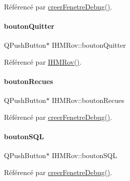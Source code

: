 Référencé par \hyperlink{class_i_h_m_rov_a30b49bada719a73e0899ad4bafb4de99}{creer\+Fenetre\+Debug()}.

\mbox{\label{class_i_h_m_rov_a75b93974e71e86a6a14ea1bc47fa7bd8}} 
\paragraph{\texorpdfstring{bouton\+Quitter}{boutonQuitter}}
{\footnotesize\ttfamily Q\+Push\+Button$\ast$ I\+H\+M\+Rov\+::bouton\+Quitter\hspace{0.3cm}{\ttfamily [private]}}



Référencé par \hyperlink{class_i_h_m_rov_a5dac1fb4612866cc61f699a415e0ef6b}{I\+H\+M\+Rov()}.

\mbox{\label{class_i_h_m_rov_ae56bf1c744f0fc393ef517e0e66b0d12}} 
\paragraph{\texorpdfstring{bouton\+Recues}{boutonRecues}}
{\footnotesize\ttfamily Q\+Push\+Button$\ast$ I\+H\+M\+Rov\+::bouton\+Recues\hspace{0.3cm}{\ttfamily [private]}}



Référencé par \hyperlink{class_i_h_m_rov_a30b49bada719a73e0899ad4bafb4de99}{creer\+Fenetre\+Debug()}.

\mbox{\label{class_i_h_m_rov_a5dca475dd63a04c96386855a84c5effb}} 
\paragraph{\texorpdfstring{bouton\+S\+QL}{boutonSQL}}
{\footnotesize\ttfamily Q\+Push\+Button$\ast$ I\+H\+M\+Rov\+::bouton\+S\+QL\hspace{0.3cm}{\ttfamily [private]}}



Référencé par \hyperlink{class_i_h_m_rov_a30b49bada719a73e0899ad4bafb4de99}{creer\+Fenetre\+Debug()}.

